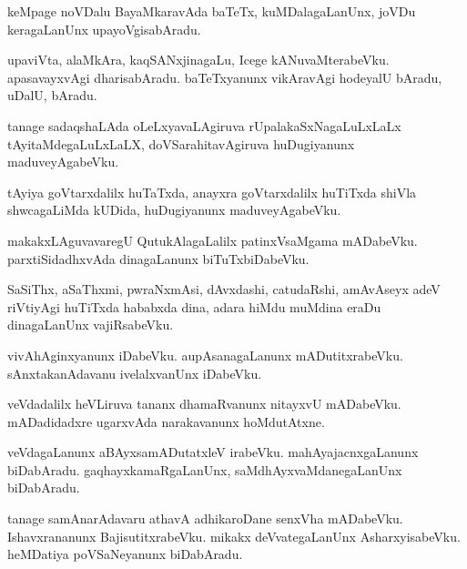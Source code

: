\documentclass{article}
\begin{document}
\begin{mn}
keMpage noVDalu BayaMkaravAda baTeTx, kuMDalagaLanUnx, joVDu keragaLanUnx upayoVgisabAradu.
\end{mn}

\begin{mn}
upaviVta, alaMkAra, kaqSANxjinagaLu, Icege kANuvaMterabeVku. apasavayxvAgi dharisabAradu. 
baTeTxyanunx vikAravAgi hodeyalU bAradu, uDalU, bAradu.
\end{mn}

\begin{mn}
tanage sadaqshaLAda oLeLxyavaLAgiruva rUpalakaSxNagaLuLxLaLx tAyitaMdegaLuLxLaLX, 
doVSarahitavAgiruva huDugiyanunx maduveyAgabeVku.
\end{mn}

\begin{mn}
tAyiya goVtarxdalilx huTaTxda, anayxra goVtarxdalilx huTiTxda shiVla shwcagaLiMda kUDida, 
huDugiyanunx maduveyAgabeVku.
\end{mn}

\begin{mn}
makakxLAguvavaregU QutukAlagaLalilx patinxVsaMgama mADabeVku. parxtiSidadhxvAda dinagaLanunx 
biTuTxbiDabeVku. 
\end{mn}

\begin{mn}
SaSiThx, aSaThxmi, pwraNxmAsi, dAvxdashi, catudaRshi, amAvAseyx adeV riVtiyAgi huTiTxda hababxda 
dina, adara hiMdu muMdina eraDu dinagaLanUnx vajiRsabeVku.
\end{mn}

\begin{mn}
vivAhAginxyanunx iDabeVku. aupAsanagaLanunx mADutitxrabeVku. sAnxtakanAdavanu ivelalxvanUnx 
iDabeVku.
\end{mn}

\begin{mn}
veVdadalilx heVLiruva tananx dhamaRvanunx nitayxvU mADabeVku. mADadidadxre ugarxvAda narakavanunx 
hoMdutAtxne.
\end{mn}

\begin{mn}
veVdagaLanunx aBAyxsamADutatxleV irabeVku. mahAyajacnxgaLanunx biDabAradu. gaqhayxkamaRgaLanUnx, 
saMdhAyxvaMdanegaLanUnx biDabAradu.
\end{mn}

\begin{mn}
tanage samAnarAdavaru athavA adhikaroDane senxVha mADabeVku. Ishavxrananunx BajisutitxrabeVku. 
mikakx deVvategaLanUnx AsharxyisabeVku. heMDatiya poVSaNeyanunx biDabAradu.
\end{mn}
\end{document}
